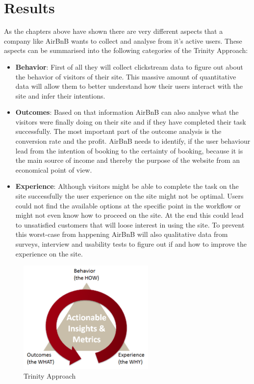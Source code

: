 \section{Results} %
\label{sec:results}

As the chapters above have shown there are very different aspects that a company like AirBnB wants to collect and analyse from it's active users. These aspects can be summarised into the following categories of the Trinity Approach:

\begin{itemize}
    \item \textbf{Behavior}: First of all they will collect clickstream data to figure out about the behavior of visitors of their site. This massive amount of quantitative data will allow them to better understand how their users interact with the site and infer their intentions. 
    \item \textbf{Outcomes}: Based on that information AirBnB can also analyse what the visitors were finally doing on their site and if they have completed their task successfully. The most important part of the outcome analysis is the conversion rate and the profit. AirBnB needs to identify, if the user behaviour lead from the intention of booking to the certainty of booking, because it is the main source of income and thereby the purpose of the website from an economical point of view. 
    \item \textbf{Experience}: Although visitors might be able to complete the task on the site successfully the user experience on the site might not be optimal. Users could not find the available options at the specific point in the workflow or might not even know how to proceed on the site. At the end this could lead to unsatisfied customers that will loose interest in using the site. To prevent this worst-case from happening AirBnB will also qualitative data from surveys, interview and usability tests to figure out if and how to improve the experience on the site.
\end{itemize}

\begin{figure}[H]
\centering
\includegraphics[width=0.6\textwidth]{assets/trinity_strategy.png}
\caption{Trinity Approach}
\label{fig:trinity}
\end{figure}

